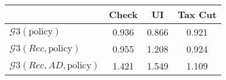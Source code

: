 \begin{tabular}{@{}lccc@{}} 
\toprule 
                          & Check      & UI    & Tax Cut    \\  \midrule 
$\mathcal{G}3(\text{policy})$ & 0.936  & 0.866  & 0.921     \\ 
$\mathcal{G}3(Rec,\text{policy})$ & 0.955  & 1.208  & 0.924     \\ 
$\mathcal{G}3(Rec, AD,\text{policy})$ & 1.421  & 1.549  & 1.109     \\ 
\end{tabular}  
